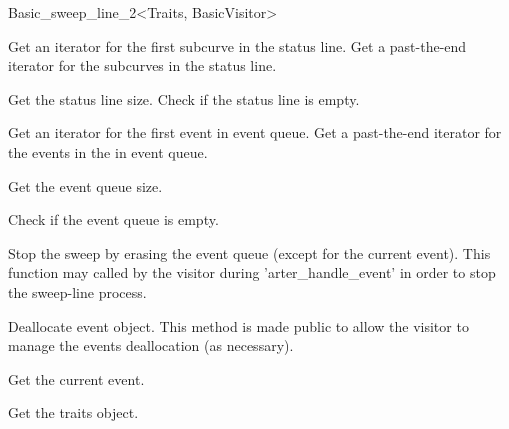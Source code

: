 \begin{ccRefClass}{Basic_sweep_line_2<Traits, BasicVisitor>}

    {Get an iterator for the first subcurve in the status line.}
\ccGlue
{}
    {Get a past-the-end iterator for the subcurves in the status line.}

    {Get the status line size.}
\ccGlue
{}
    {Check if the status line is empty.}

    {Get an iterator for the first event in event queue.}
\ccGlue
{}
    {Get a past-the-end iterator for the events in the in event queue.}
    
    {Get the event queue size.}
    
    {Check if the event queue is empty.}
    
    {Stop the sweep by erasing the event queue (except for the current event).
     This function may called by the visitor during 'arter_handle_event' in
     order to stop the sweep-line process.}
     
    { Deallocate event object.
      This method is made public to allow the visitor to manage the events
      deallocation (as necessary). }
    
    {Get the current event.}
    
    {Get the traits object.}
    

\end{ccRefClass}

\ccRefPageEnd
